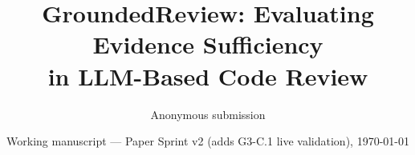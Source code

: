 \documentclass[11pt]{article}
\title{\textbf{GroundedReview: Evaluating Evidence Sufficiency \\
in LLM-Based Code Review}}
\author{Anonymous submission}
\date{Working manuscript --- Paper Sprint v2 (adds G3-C.1 live validation), \today}
\begin{document}
\maketitle

\begin{abstract}

\end{abstract}















\appendix

\end{document}
